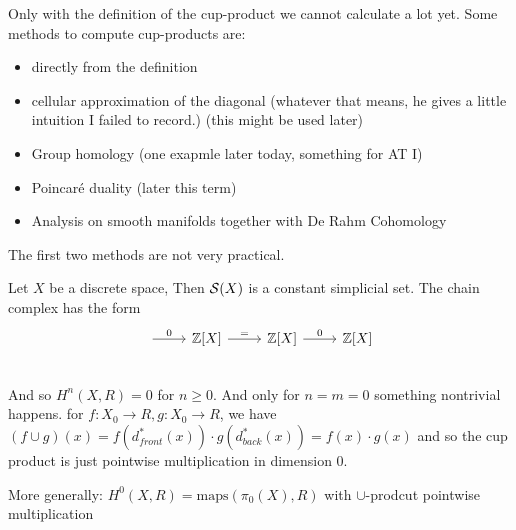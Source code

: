\documentclass[language=english]{TemplateLecture}
\begin{document}
Only with the definition of the cup-product we cannot calculate a lot yet. Some methods to compute cup-products are:
\begin{itemize}
    \item directly from the definition
    \item cellular approximation of the diagonal (whatever that means, he gives a little intuition I failed to record.) (this might be used later)
    \item Group homology (one exapmle later today, something for AT I)
    \item Poincaré duality (later this term)
    \item Analysis on smooth manifolds together with De Rahm Cohomology 
\end{itemize}
The first two methods are not very practical.

\begin{example}
    Let \(X\) be a discrete space, Then \(\mathcal{S}(X)\) is a constant simplicial set. The chain complex has the form
    \[\begin{tikzcd}
        \ar[r, "0"] & \IZ[X] \ar[r, "="] & \IZ[X] \ar[r, "0"] & \IZ[X]\\
    \end{tikzcd}\]
    And so \(H^n(X,R) = 0\) for \(n \geq 0\).
    And only for \(n = m = 0\) something nontrivial happens. for \(f\colon X_0 \to R, g\colon X_0 \to R\), we have \((f\cup g)(x) = f(d_{front}^*(x)) \cdot g(d_{back}^*(x)) = f(x) \cdot g(x)\)
    and so the cup product is just pointwise multiplication in dimension \(0\).

    More generally: \(H^0(X,R) = \mathrm{maps}(\pi_0(X),R)\) with \(\cup\)-prodcut pointwise multiplication
\end{example}
\end{document}
